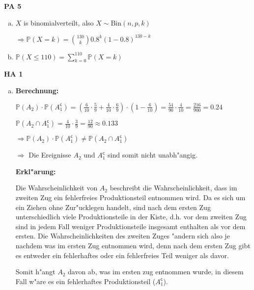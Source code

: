 \documentclass[a4paper,12pt]{article}
\newcommand{\Aufgabe}[1]{
        {
        \vspace*{0.5cm}
        \textbf{HA #1}
        \vspace*{0.2cm}
    }
}
\newcommand{\PAufgabe}[1]{
        {
        \vspace*{0.5cm}
        \textbf{PA #1}
        \vspace*{0.2cm}
    }
}
\begin{document}
    \PAufgabe{5}
    \begin{enumerate}[(a)]
        \item 

        $ X $ is binomialverteilt, also $ X \sim \text{Bin}(n, p, k) $

        $ \displaystyle \Rightarrow \mathbb{P}(X = k) = \binom{130}{k} 0.8^k (1 - 0.8)^{130 - k} $ 

        \item

        $ \displaystyle \mathbb{P}(X \leq 110) = \sum\limits_{k = 0}^{110} \mathbb{P}(X = k) $

    \end{enumerate}

    \Aufgabe{1}

    \begin{enumerate}[(b)]
        \item 

        \textbf{Berechnung:}

        $ \displaystyle \mathbb{P}(A_2) \cdot \mathbb{P}(A_1^{\mathsf{c}}) = (\frac{6}{10} \cdot \frac{5}{9} + \frac{4}{10} \cdot \frac{6}{9}) \cdot (1 - \frac{6}{10}) = \frac{54}{90} \cdot \frac{4}{10} = \frac{216}{900} = 0.24 $

        $ \displaystyle \mathbb{P}(A_2 \cap A_1^{\mathsf{c}}) = \frac{4}{10} \cdot \frac{3}{9} = \frac{12}{90} \approx 0.133 $

        $ \Rightarrow \mathbb{P}(A_2) \cdot \mathbb{P}(A_1^{\mathsf{c}}) \neq \mathbb{P}(A_2 \cap A_1^{\mathsf{c}}) $ 
        
        $\Rightarrow $ Die Ereignisse $ A_2 $ und $ A_1^{\mathsf{c}} $ sind somit nicht unabh"angig.

        \bigskip

        \textbf{Erkl"arung:}

        Die Wahrscheinlichkeit von $ A_2 $ beschreibt die Wahrscheinlichkeit, dass im zweiten Zug ein fehlerfreies Produktionsteil entnommen wird.
        Da es sich um ein Ziehen ohne Zur"ucklegen handelt, sind nach dem ersten Zug unterschiedlich viele Produktionsteile in der Kiste, d.h. vor dem zweiten
        Zug sind in jedem Fall weniger Produktionsteile insgesamt enthalten als vor dem ersten. Die Wahrscheinlichkeiten des zweiten Zuges "andern sich also je nachdem 
        was im ersten Zug entnommen wird, denn nach dem ersten Zug gibt es entweder ein fehlerhaftes oder ein fehlerfreies Teil weniger als davor. 
        
        Somit h"angt $ A_2 $ davon ab, was im ersten zug entnommen wurde, in diesem Fall w"are es ein fehlerhaftes Produktionsteil ($ A_1^{\mathsf{c}} $).
    \end{enumerate}
\end{document}
